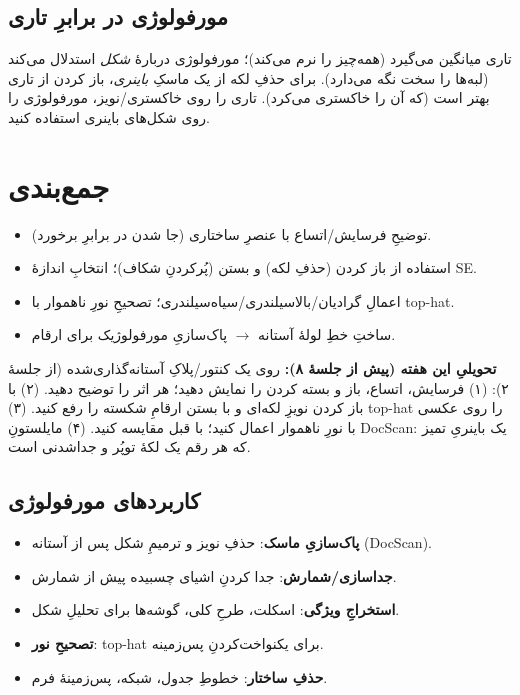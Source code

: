 \documentclass[12pt,a4paper]{article}
\begin{document}
\subsection{مورفولوژی در برابرِ تاری}

تاری میانگین می‌گیرد (همه‌چیز را نرم می‌کند)؛ مورفولوژی دربارهٔ \emph{شکل} استدلال می‌کند (لبه‌ها
را سخت نگه می‌دارد). برای حذفِ لکه از یک ماسکِ \emph{باینری}، باز کردن از تاری بهتر است (که آن را
خاکستری می‌کرد). تاری را روی خاکستری/نویز، مورفولوژی را روی شکل‌های باینری استفاده کنید.

\section{جمع‌بندی}

\begin{itemize}
  \item توضیحِ فرسایش/اتساع با عنصرِ ساختاری (جا شدن در برابرِ برخورد).
  \item استفاده از باز کردن (حذفِ لکه) و بستن (پُرکردنِ شکاف)؛ انتخابِ اندازهٔ SE.
  \item اعمالِ گرادیان/بالاسیلندری/سیاه‌سیلندری؛ تصحیحِ نورِ ناهموار با top-hat.
  \item ساختِ خطِ لولهٔ آستانه $\rightarrow$ پاک‌سازیِ مورفولوژیک برای ارقام.
\end{itemize}

\begin{tamrin}
\textbf{تحویلیِ این هفته (پیش از جلسهٔ ۸):} روی یک کنتور/پلاکِ آستانه‌گذاری‌شده (از جلسهٔ ۲):
(۱) فرسایش، اتساع، باز و بسته کردن را نمایش دهید؛ هر اثر را توضیح دهید. (۲) با باز کردن نویزِ
لکه‌ای و با بستن ارقامِ شکسته را رفع کنید. (۳) top-hat را روی عکسی با نورِ ناهموار اعمال کنید؛ با
قبل مقایسه کنید. (۴) مایلستونِ DocScan: یک باینریِ تمیز که هر رقم یک لکهٔ توپُر و جداشدنی است.
\end{tamrin}

\subsection*{کاربردهای مورفولوژی}

\begin{itemize}
  \item \textbf{پاک‌سازیِ ماسک}: حذفِ نویز و ترمیمِ شکل پس از آستانه (DocScan).
  \item \textbf{جداسازی/شمارش}: جدا کردنِ اشیای چسبیده پیش از شمارش.
  \item \textbf{استخراجِ ویژگی}: اسکلت، طرحِ کلی، گوشه‌ها برای تحلیلِ شکل.
  \item \textbf{تصحیحِ نور}: top-hat برای یکنواخت‌کردنِ پس‌زمینه.
  \item \textbf{حذفِ ساختار}: خطوطِ جدول، شبکه، پس‌زمینهٔ فرم.
\end{itemize}
\end{document}
